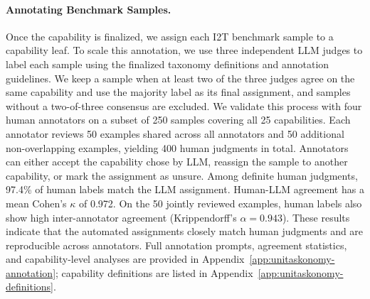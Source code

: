\paragraph{Annotating Benchmark Samples.}
Once the capability is finalized, we assign each I2T benchmark sample to a capability leaf.
To scale this annotation, we use three independent LLM judges to label each sample using the finalized taxonomy definitions and annotation guidelines.
We keep a sample when at least two of the three judges agree on the same capability and use the majority label as its final assignment, and samples without a two-of-three consensus are excluded.
We validate this process with four human annotators on a subset of 250 samples covering all 25 capabilities.
Each annotator reviews 50 examples shared across all annotators and 50 additional non-overlapping examples, yielding 400 human judgments in total.
Annotators can either accept the capability chose by LLM, reassign the sample to another capability, or mark the assignment as unsure.
Among definite human judgments, 97.4\% of human labels match the LLM assignment.
Human-LLM agreement has a mean Cohen's $\kappa$ of 0.972.
On the 50 jointly reviewed examples, human labels also show high inter-annotator agreement (Krippendorff's $\alpha=0.943$).
These results indicate that the automated assignments closely match human judgments and are reproducible across annotators.
Full annotation prompts, agreement statistics, and capability-level analyses are provided in Appendix~\ref{app:unitaskonomy-annotation}; capability definitions are listed in Appendix~\ref{app:unitaskonomy-definitions}.

